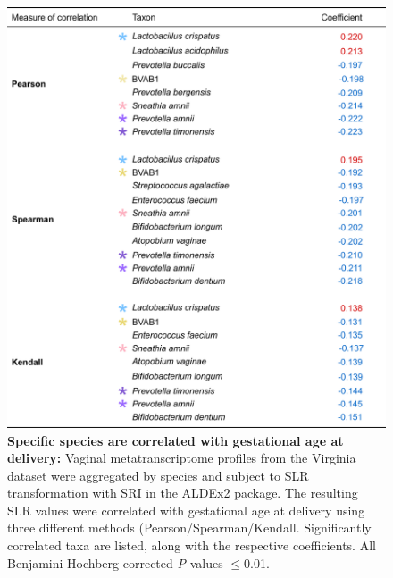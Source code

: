 \documentclass[sn-mathphys,Numbered]{sn-jnl}%
\begin{document}
\begin{figure}[H]
    \centering
    \includegraphics[scale = 0.8]{0_supplFig3.png}
    \caption{\textbf{Specific species are correlated with gestational age at delivery:} Vaginal metatranscriptome profiles from the Virginia dataset were aggregated by species and subject to SLR transformation with SRI in the ALDEx2 package. The resulting SLR values were correlated with gestational age at delivery using three different methods (Pearson/Spearman/Kendall. Significantly correlated taxa are listed, along with the respective coefficients. All Benjamini-Hochberg-corrected \textit{P}-values $\leq$0.01.} \label{fig:sfigPTBcorr}
\end{figure}
\newpage
\end{document}
